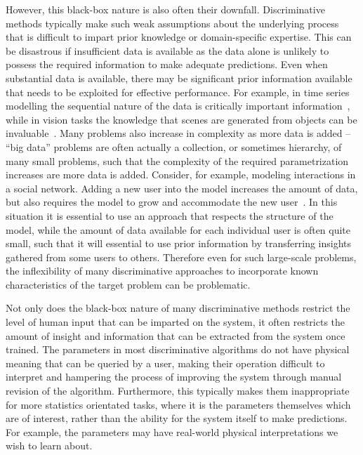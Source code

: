 However, this black-box nature is also often their downfall.  Discriminative methods typically make
such weak assumptions about the underlying process that is difficult to impart prior knowledge
or domain-specific expertise.  This can be disastrous if insufficient data is available as the data
alone is unlikely to possess the required information to make adequate predictions.  Even when
substantial data is available, there may be significant prior information available that needs to be
exploited for effective performance.  For example, in time series modelling the sequential nature
of the data is critically important information~\citep{liu1998sequential}, while in vision tasks the 
knowledge that scenes are generated from objects can be invaluable~\citep{kulkarni2015picture}.
Many problems also increase in complexity as more data is added -- ``big data'' problems are often
actually a collection, or sometimes hierarchy, of many small problems, such that the complexity of the
required parametrization increases are more data is added.  Consider, for example, modeling interactions in
a social network.  Adding a new user into the model increases the amount of data, but also
requires the model to grow and accommodate the new user~\citep{ravasz2003hierarchical}.  In
this situation it is essential to
use an approach that respects the structure of the model, while the amount of data available
for each individual user is often quite small, such that it will essential to use prior information
by transferring insights gathered from some users to others.  Therefore even for such large-scale
problems, the inflexibility of many discriminative approaches to incorporate known characteristics
of the target problem can be problematic.

Not only does the black-box nature of many discriminative methods restrict the level of
human input that can be imparted on the system, it often restricts the amount of insight
and information that can be extracted from the system once trained.  The parameters in most discriminative
algorithms do not have physical meaning that can be queried by a user, making their operation
difficult to interpret and hampering the process of improving the system through manual
revision of the algorithm.  Furthermore, this typically makes them inappropriate for more
statistics orientated tasks, where it is the parameters themselves which are of interest, rather
than the ability for the system itself to make predictions.  For example, the parameters may
have real-world physical interpretations we wish to learn about.


